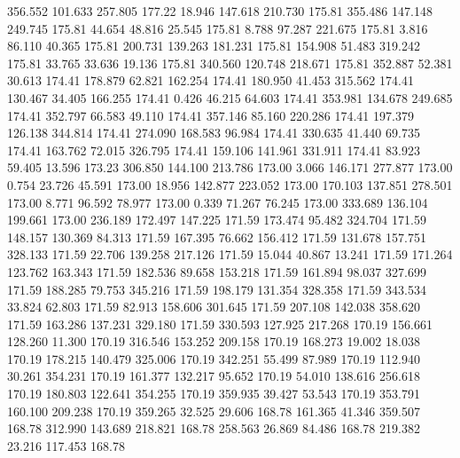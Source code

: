  356.552  101.633  257.805       177.22
  18.946  147.618  210.730       175.81
 355.486  147.148  249.745       175.81
  44.654   48.816   25.545       175.81
   8.788   97.287  221.675       175.81
   3.816   86.110   40.365       175.81
 200.731  139.263  181.231       175.81
 154.908   51.483  319.242       175.81
  33.765   33.636   19.136       175.81
 340.560  120.748  218.671       175.81
 352.887   52.381   30.613       174.41
 178.879   62.821  162.254       174.41
 180.950   41.453  315.562       174.41
 130.467   34.405  166.255       174.41
   0.426   46.215   64.603       174.41
 353.981  134.678  249.685       174.41
 352.797   66.583   49.110       174.41
 357.146   85.160  220.286       174.41
 197.379  126.138  344.814       174.41
 274.090  168.583   96.984       174.41
 330.635   41.440   69.735       174.41
 163.762   72.015  326.795       174.41
 159.106  141.961  331.911       174.41
  83.923   59.405   13.596       173.23
 306.850  144.100  213.786       173.00
   3.066  146.171  277.877       173.00
   0.754   23.726   45.591       173.00
  18.956  142.877  223.052       173.00
 170.103  137.851  278.501       173.00
   8.771   96.592   78.977       173.00
   0.339   71.267   76.245       173.00
 333.689  136.104  199.661       173.00
 236.189  172.497  147.225       171.59
 173.474   95.482  324.704       171.59
 148.157  130.369   84.313       171.59
 167.395   76.662  156.412       171.59
 131.678  157.751  328.133       171.59
  22.706  139.258  217.126       171.59
  15.044   40.867   13.241       171.59
 171.264  123.762  163.343       171.59
 182.536   89.658  153.218       171.59
 161.894   98.037  327.699       171.59
 188.285   79.753  345.216       171.59
 198.179  131.354  328.358       171.59
 343.534   33.824   62.803       171.59
  82.913  158.606  301.645       171.59
 207.108  142.038  358.620       171.59
 163.286  137.231  329.180       171.59
 330.593  127.925  217.268       170.19
 156.661  128.260   11.300       170.19
 316.546  153.252  209.158       170.19
 168.273   19.002   18.038       170.19
 178.215  140.479  325.006       170.19
 342.251   55.499   87.989       170.19
 112.940   30.261  354.231       170.19
 161.377  132.217   95.652       170.19
  54.010  138.616  256.618       170.19
 180.803  122.641  354.255       170.19
 359.935   39.427   53.543       170.19
 353.791  160.100  209.238       170.19
 359.265   32.525   29.606       168.78
 161.365   41.346  359.507       168.78
 312.990  143.689  218.821       168.78
 258.563   26.869   84.486       168.78
 219.382   23.216  117.453       168.78
